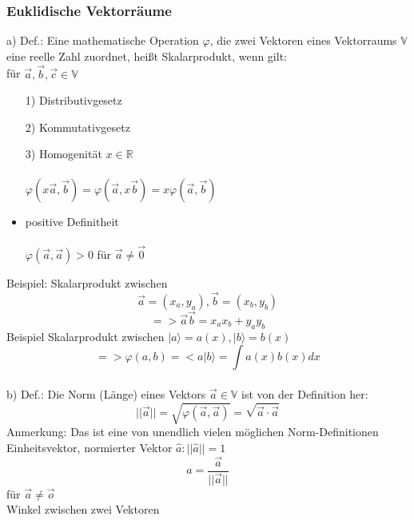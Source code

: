 \documentclass{article}
\begin{document}
\subsubsection{Euklidische Vektorräume}
a) Def.: Eine mathematische Operation $\varphi$, die zwei Vektoren eines Vektorraums $\mathbb{V}$ eine reelle Zahl zuordnet, heißt Skalarprodukt, wenn gilt:\\
für $\vec{a},\vec{b},\vec{c} \in \mathbb{V}$\\
\begin{itemize}
    \item[1)] Distributivgesetz
    \item[2)] Kommutativgesetz
    \item[3)] Homogenität $x \in \mathbb{R}$\\\\
    $\varphi\left(x\vec{a},\vec{b}\right)=\varphi\left(\vec{a},x\vec{b}\right)=x\varphi\left(\vec{a},\vec{b}\right)$
    \item positive Definitheit\\\\
    $\varphi\left(\vec{a},\vec{a}\right) > 0$ für $\vec{a} \neq \vec{0}$
\end{itemize}
Beispiel: Skalarprodukt zwischen
\begin{equation*}
    \vec{a}=\left(x_a,y_a\right),\vec{b}=\left(x_b,y_b\right)
\end{equation*}
\begin{equation*}
    => \vec{a}\vec{b}=x_ax_b+y_ay_b
\end{equation*}
Beispiel Skalarprodukt zwischen $|a\rangle =a(x), |b\rangle =b(x)$
\begin{equation*}
    => \varphi\left(a,b\right) = <a|b\rangle =\int a(x)b(x)dx
\end{equation*}
\\
b) Def.: Die Norm (Länge) eines Vektors $\vec{a}\in\mathbb{V}$ ist von der Definition her:
\begin{equation*}
    ||\vec{a}|| = \sqrt{\varphi\left(\vec{a},\vec{a}\right)}=\sqrt{\vec{a}\cdot\vec{a}}
\end{equation*}
Anmerkung: Das ist eine von unendlich vielen möglichen Norm-Definitionen\\
Einheitsvektor, normierter Vektor $\hat{a}: ||\hat{a}|| = 1$
\begin{equation*}
    \hat{a}=\frac{\vec{a}}{||\vec{a}||}
\end{equation*} 
für $\vec{a} \neq \vec{o}$\\
Winkel zwischen zwei Vektoren
\end{document}
